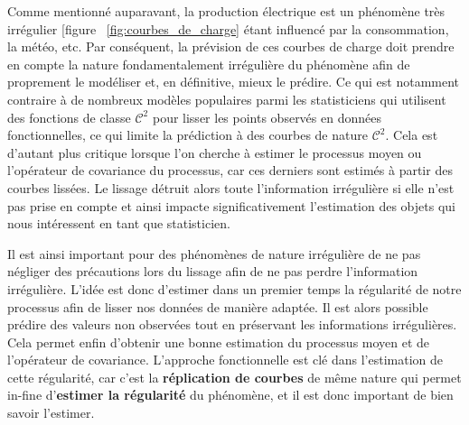 Comme mentionné auparavant, la production électrique est un phénomène très irrégulier [figure ~\ref{fig:courbes_de_charge} étant influencé par la consommation, la météo, etc. Par conséquent, la prévision de ces courbes de charge doit prendre en compte la nature fondamentalement irrégulière du phénomène afin de proprement le modéliser et, en définitive, mieux le prédire. 
Ce qui est notamment contraire à de nombreux modèles populaires parmi les statisticiens qui utilisent des fonctions de classe $\mathcal C^2$ pour lisser les points observés en données fonctionnelles, ce qui limite la prédiction à des courbes de nature $\mathcal C^2$. 
Cela est d'autant plus critique lorsque l'on cherche à estimer le processus moyen ou l'opérateur de covariance du processus, car ces derniers sont estimés à partir des courbes lissées. 
Le lissage détruit alors toute l'information irrégulière si elle n'est pas prise en compte et ainsi impacte significativement l'estimation des objets qui nous intéressent en tant que statisticien.



Il est ainsi important pour des phénomènes de nature irrégulière de ne pas négliger des précautions lors du lissage afin de ne pas perdre l'information irrégulière. L'idée est donc d'estimer dans un premier temps la régularité de notre processus afin de lisser nos données de manière adaptée. Il est alors possible prédire des valeurs non observées tout en préservant les informations irrégulières. Cela permet enfin d'obtenir une bonne estimation du processus moyen et de l'opérateur de covariance. L'approche fonctionnelle est clé dans l'estimation de cette régularité, car c'est la \textbf{réplication de courbes} de même nature qui permet in-fine d'\textbf{estimer la régularité} du phénomène, et il est donc important de bien savoir l'estimer.